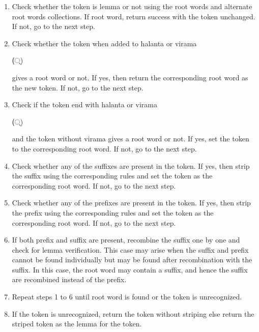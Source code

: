 \documentclass[conference]{IEEEtran}
\begin{document}
\begin{enumerate}

    \item Check whether the token is lemma or not using the root words and
      alternate root words collections. If root word, return success with the
      token unchanged. If not, go to the next step. \medskip
    
    \item Check whether the token when added to halanta or virama
      \begin{sanskrit}(्)\end{sanskrit} gives a root word or not. If yes, then
      return the corresponding root word as the new token. If not, go to the
      next step.\medskip
    
    \item Check if the token end with halanta or virama
      \begin{sanskrit}(्)\end{sanskrit} and the token without virama gives a root
      word or not. If yes, set the token to the corresponding root word. If not,
      go to the next step.\medskip
    
    \item  Check whether any of the suffixes are present in the token. If yes,
      then strip the suffix using the corresponding rules and set the token as
      the corresponding root word. If not, go to the next step.\medskip
    
    \item Check whether any of the prefixes are present in the token. If yes,
      then strip the prefix using the corresponding rules and set the token as
      the corresponding root word. If not, go to the next step.\medskip
    
    \item If both prefix and suffix are present, recombine the suffix one by one
      and check for lemma verification. This case may arise when the suffix and
      prefix cannot be found individually but may be found after recombination
      with the suffix. 
      In this case, the root word may contain a suffix, and hence the 
      suffix are recombined instead of the prefix.\medskip
     
    \item Repeat steps 1 to 6 until root word is found or the token is
      unrecognized.\medskip
    
    \item If the token is unrecognized, return the token without striping else
      return the striped token as the lemma for the token.\medskip
    
\end{enumerate}
\end{document}
